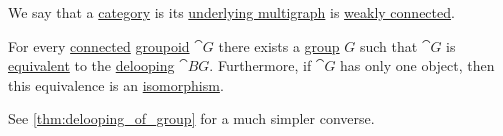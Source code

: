 \begin{definition}\label{def:connected_category}
  We say that a \hyperref[def:category]{category} is  its \hyperref[def:category]{underlying multigraph} is \hyperref[def:graph_connectedness/weak]{weakly connected}.
\end{definition}

\begin{proposition}\label{thm:connected_delooping}
  For every \hyperref[def:connected_category]{connected} \hyperref[def:groupoid]{groupoid} \( \cat{G} \) there exists a \hyperref[def:group]{group} \( G \) such that \( \cat{G} \) is \hyperref[def:category_equivalence]{equivalent} to the \hyperref[def:monoid_delooping]{delooping} \( \cat{B} G \). Furthermore, if \( \cat{G} \) has only one object, then this equivalence is an \hyperref[rem:category_similarity/isomorphism]{isomorphism}.
\end{proposition}
\begin{comments}
  \item See \cref{thm:delooping_of_group} for a much simpler converse.
\end{comments}
